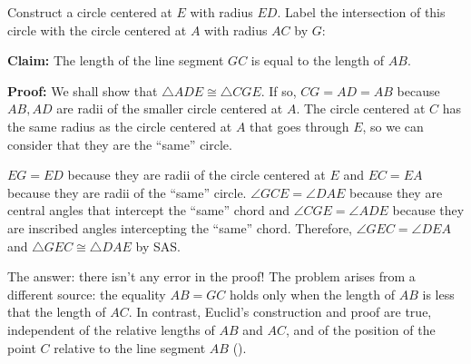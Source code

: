 Construct a circle centered at $E$ with radius $ED$. Label the intersection of this circle with the circle centered at $A$ with radius $AC$ by $G$:

\begin{center}
\end{center}

\textbf{Claim:} The length of the line segment $GC$ is equal to the length of $AB$.

\textbf{Proof:} We shall show that $\triangle ADE\cong\triangle CGE$. If so, $CG=AD=AB$ because $AB,AD$ are radii of the smaller circle centered at $A$. The circle centered at $C$ has the same radius as the circle centered at $A$ that goes through $E$, so we can consider that they are the ``same'' circle.

$EG=ED$ because they are radii of the circle centered at $E$ and $EC=EA$ because they are radii of the ``same'' circle. $\angle GCE=\angle DAE$ because they are central angles that intercept the ``same'' chord and $\angle CGE=\angle ADE$ because they are inscribed angles intercepting the ``same'' chord. Therefore, $\angle GEC=\angle DEA$ and $\triangle GEC\cong \triangle DAE$ by SAS. 

The answer: there isn't any error in the proof! The problem arises from a different source: the equality $AB=GC$ holds only when the length of $AB$ is less that the length of $AC$. In contrast, Euclid's construction and proof are true, independent of the relative lengths of  $AB$ and $AC$, and of the position of the point $C$ relative to the line segment $AB$ (\cite{toussaint}).


